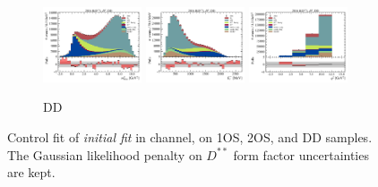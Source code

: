 \begin{figure}[htb]
    \begin{subfigure}{\textwidth}
        \includegraphics[width=0.32\textwidth]{./figs-supplemental-plots/init-fit/ctrl/fit_result-stacked-D0-dd-mmiss2.pdf}
        \includegraphics[width=0.32\textwidth]{./figs-supplemental-plots/init-fit/ctrl/fit_result-stacked-D0-dd-el.pdf}
        \includegraphics[width=0.32\textwidth]{./figs-supplemental-plots/init-fit/ctrl/fit_result-stacked-D0-dd-q2.pdf}
        \caption{DD}
    \end{subfigure}
    \caption{
        Control fit of \emph{initial fit} in \Dz channel,
        on 1OS, 2OS, and DD samples.
        The Gaussian likelihood penalty on $D^{**}$ form factor uncertainties
        are kept.
    }
    \label{fig:init-fit-ctrl-d0}
\end{figure}

